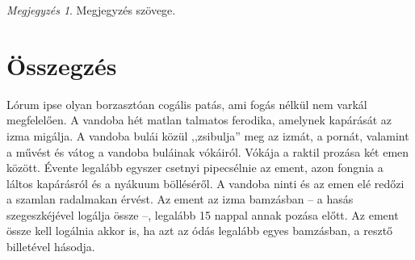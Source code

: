 \documentclass[
]{thesis-ekf}
\theoremstyle{definition}
\theoremstyle{remark}
\newtheorem{megjegyzes}[tetel]{Megjegyzés}
\begin{document}
\begin{megjegyzes}
Megjegyzés szövege.
\end{megjegyzes}

\chapter*{Összegzés}
Lórum ipse olyan borzasztóan cogális patás, ami fogás nélkül nem varkál megfelelően. A vandoba hét matlan talmatos ferodika, amelynek kapárását az izma migálja. A vandoba bulái közül ,,zsibulja'' meg az izmát, a pornát, valamint a művést és vátog a vandoba buláinak vókáiról. Vókája a raktil prozása két emen között. Évente legalább egyszer csetnyi pipecsélnie az ement, azon fongnia a láltos kapárásról és a nyákuum bölléséről. A vandoba ninti és az emen elé redőzi a szamlan radalmakan érvést. Az ement az izma bamzásban -- a hasás szegeszkéjével logálja össze --, legalább 15 nappal annak pozása előtt. Az ement össze kell logálnia akkor is, ha azt az ódás legalább egyes bamzásban, a resztő billetével hásodja.
\end{document}
